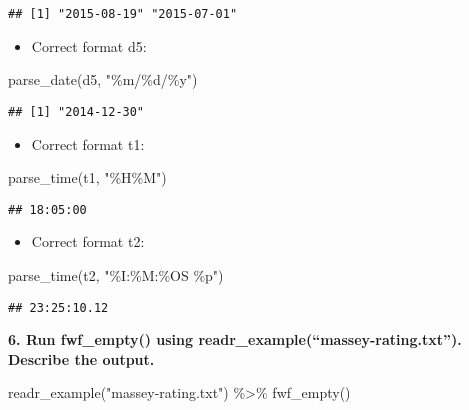\documentclass[
]{article}
\newenvironment{Shaded}{\begin{snugshade}}{\end{snugshade}}
\newcommand{\FunctionTok}[1]{\textcolor[rgb]{0.00,0.00,0.00}{#1}}
\newcommand{\NormalTok}[1]{#1}
\newcommand{\SpecialCharTok}[1]{\textcolor[rgb]{0.00,0.00,0.00}{#1}}
\newcommand{\StringTok}[1]{\textcolor[rgb]{0.31,0.60,0.02}{#1}}
\providecommand{\tightlist}{%
  \setlength{\itemsep}{0pt}\setlength{\parskip}{0pt}}
\begin{document}
\begin{verbatim}
## [1] "2015-08-19" "2015-07-01"
\end{verbatim}

\begin{itemize}
\tightlist
\item
  Correct format d5:
\end{itemize}

\begin{Shaded}
\begin{Highlighting}[]
\FunctionTok{parse\_date}\NormalTok{(d5, }\StringTok{"\%m/\%d/\%y"}\NormalTok{)}
\end{Highlighting}
\end{Shaded}

\begin{verbatim}
## [1] "2014-12-30"
\end{verbatim}

\begin{itemize}
\tightlist
\item
  Correct format t1:
\end{itemize}

\begin{Shaded}
\begin{Highlighting}[]
\FunctionTok{parse\_time}\NormalTok{(t1, }\StringTok{"\%H\%M"}\NormalTok{)}
\end{Highlighting}
\end{Shaded}

\begin{verbatim}
## 18:05:00
\end{verbatim}

\begin{itemize}
\tightlist
\item
  Correct format t2:
\end{itemize}

\begin{Shaded}
\begin{Highlighting}[]
\FunctionTok{parse\_time}\NormalTok{(t2, }\StringTok{"\%I:\%M:\%OS \%p"}\NormalTok{)}
\end{Highlighting}
\end{Shaded}

\begin{verbatim}
## 23:25:10.12
\end{verbatim}

\textbf{6. Run fwf\_empty() using readr\_example(``massey-rating.txt'').
Describe the output.}

\begin{Shaded}
\begin{Highlighting}[]
\FunctionTok{readr\_example}\NormalTok{(}\StringTok{"massey{-}rating.txt"}\NormalTok{) }\SpecialCharTok{\%\textgreater{}\%}
  \FunctionTok{fwf\_empty}\NormalTok{()}
\end{Highlighting}
\end{Shaded}
\end{document}
